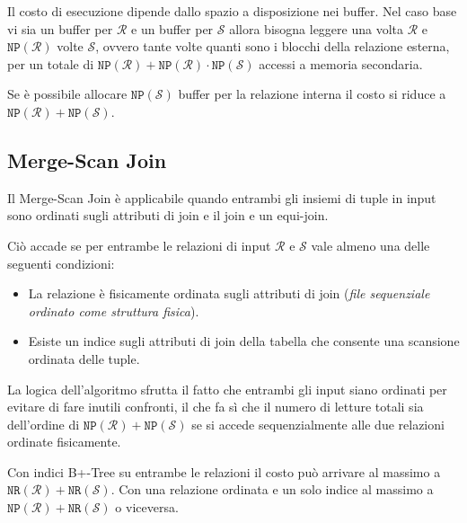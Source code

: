 \documentclass[oneside,a4paper,11pt]{book}
\theoremstyle{italicstyle}
\theoremstyle{normStyle}
\begin{document}
Il costo di esecuzione dipende dallo spazio a disposizione nei buffer. Nel caso 
base vi sia un buffer per $\mathcal{R}$ e un buffer per $\mathcal{S}$ allora bisogna 
leggere una volta $\mathcal{R}$ e $\texttt{NP}(\mathcal{R})$ volte $\mathcal{S}$, ovvero 
tante volte quanti sono i blocchi della relazione esterna, per un totale di 
$\texttt{NP}(\mathcal{R}) + \texttt{NP}(\mathcal{R}) \cdot \texttt{NP}(\mathcal{S})$ accessi a memoria secondaria.

Se è possibile allocare $\texttt{NP}(\mathcal{S})$ buffer per la relazione interna il costo si riduce a 
$\texttt{NP}(\mathcal{R}) + \texttt{NP}(\mathcal{S})$.
\subsection{Merge-Scan Join}
Il Merge-Scan Join è applicabile quando entrambi gli insiemi di tuple in input sono ordinati 
sugli attributi di join e il join e un equi-join.

Ciò accade se per entrambe le relazioni di input $\mathcal{R}$ e $\mathcal{S}$ 
vale almeno una delle seguenti condizioni:
\begin{itemize}
  \item La relazione è fisicamente ordinata sugli attributi di join (\textit{file 
  sequenziale ordinato come struttura fisica}).
  \item Esiste un indice sugli attributi di join della tabella che consente una scansione ordinata 
  delle tuple.
\end{itemize}
La logica dell'algoritmo sfrutta il fatto che entrambi gli input siano ordinati 
per evitare di fare inutili confronti, il che fa sì che il numero di letture totali 
sia dell'ordine di $\texttt{NP}(\mathcal{R}) + \texttt{NP}(\mathcal{S})$ se si accede sequenzialmente alle 
due relazioni ordinate fisicamente.

Con indici B+-Tree su entrambe le relazioni il costo può arrivare al massimo a 
$\texttt{NR}(\mathcal{R}) + \texttt{NR}(\mathcal{S})$.
Con una relazione ordinata e un solo indice al massimo a $\texttt{NP}(\mathcal{R}) + \texttt{NR}(\mathcal{S})$ o viceversa.
\end{document}
